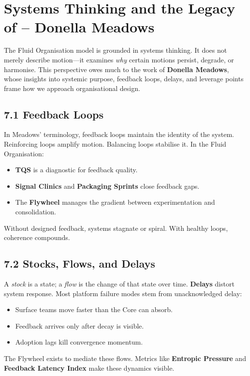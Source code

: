 \documentclass[12pt]{article}
\begin{document}
\section{Systems Thinking and the Legacy of -- Donella Meadows}

The Fluid Organisation model is grounded in systems thinking. It does not merely describe motion—it examines \textit{why} certain motions persist, degrade, or harmonise. This perspective owes much to the work of \textbf{Donella Meadows}, whose insights into systemic purpose, feedback loops, delays, and leverage points frame how we approach organisational design.

\subsection*{7.1 Feedback Loops}

In Meadows’ terminology, feedback loops maintain the identity of the system. Reinforcing loops amplify motion. Balancing loops stabilise it. In the Fluid Organisation:
\begin{itemize}
    \item \textbf{TQS} is a diagnostic for feedback quality.
    \item \textbf{Signal Clinics} and \textbf{Packaging Sprints} close feedback gaps.
    \item The \textbf{Flywheel} manages the gradient between experimentation and consolidation.
\end{itemize}

Without designed feedback, systems stagnate or spiral. With healthy loops, coherence compounds.

\subsection*{7.2 Stocks, Flows, and Delays}

A \textit{stock} is a state; a \textit{flow} is the change of that state over time. \textbf{Delays} distort system response. Most platform failure modes stem from unacknowledged delay:
\begin{itemize}
    \item Surface teams move faster than the Core can absorb.
    \item Feedback arrives only after decay is visible.
    \item Adoption lags kill convergence momentum.
\end{itemize}

The Flywheel exists to mediate these flows. Metrics like \textbf{Entropic Pressure} and \textbf{Feedback Latency Index} make these dynamics visible.
\end{document}
